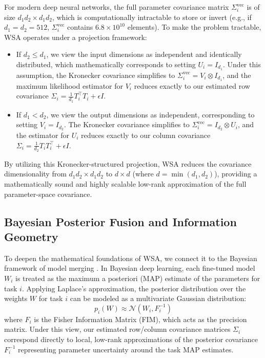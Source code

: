 \documentclass{article}
\theoremstyle{plain}
\theoremstyle{definition}
\theoremstyle{remark}
\begin{document}
For modern deep neural networks, the full parameter covariance matrix $\Sigma_i^{\text{vec}}$ is of size $d_1 d_2 \times d_1 d_2$, which is computationally intractable to store or invert (e.g., if $d_1 = d_2 = 512$, $\Sigma_i^{\text{vec}}$ contains $6.8 \times 10^{10}$ elements). To make the problem tractable, WSA operates under a projection framework:
\begin{itemize}
  \item If $d_2 \leq d_1$, we view the input dimensions as independent and identically distributed, which mathematically corresponds to setting $U_i = I_{d_1}$. Under this assumption, the Kronecker covariance simplifies to $\Sigma_i^{\text{vec}} = V_i \otimes I_{d_1}$, and the maximum likelihood estimator for $V_i$ reduces exactly to our estimated row covariance $\Sigma_i = \frac{1}{d_1} T_i^\top T_i + \epsilon I$.
  \item If $d_1 < d_2$, we view the output dimensions as independent, corresponding to setting $V_i = I_{d_2}$. The Kronecker covariance simplifies to $\Sigma_i^{\text{vec}} = I_{d_2} \otimes U_i$, and the estimator for $U_i$ reduces exactly to our column covariance $\Sigma_i = \frac{1}{d_2} T_i T_i^\top + \epsilon I$.
\end{itemize}
By utilizing this Kronecker-structured projection, WSA reduces the covariance dimensionality from $d_1 d_2 \times d_1 d_2$ to $d \times d$ (where $d = \min(d_1, d_2)$), providing a mathematically sound and highly scalable low-rank approximation of the full parameter-space covariance.

\subsection{Bayesian Posterior Fusion and Information Geometry}
To deepen the mathematical foundations of WSA, we connect it to the Bayesian framework of model merging \cite{matena22}. In Bayesian deep learning, each fine-tuned model $W_i$ is treated as the maximum a posteriori (MAP) estimate of the parameters for task $i$. Applying Laplace's approximation, the posterior distribution over the weights $W$ for task $i$ can be modeled as a multivariate Gaussian distribution:
\begin{equation}
  p_i(W) \approx \mathcal{N}\left(W_i, F_i^{-1}\right)
\end{equation}
where $F_i$ is the Fisher Information Matrix (FIM), which acts as the precision matrix. Under this view, our estimated row/column covariance matrices $\Sigma_i$ correspond directly to local, low-rank approximations of the posterior covariance $F_i^{-1}$ representing parameter uncertainty around the task MAP estimates.
\end{document}
